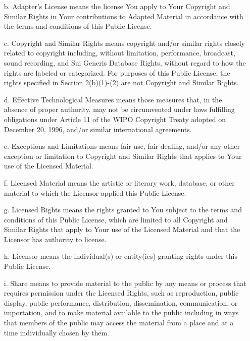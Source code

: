 \begin{scriptsize}
\begin{itemize}
  \item[b.] Adapter's License means the license You apply to Your Copyright
     and Similar Rights in Your contributions to Adapted Material in
     accordance with the terms and conditions of this Public License.

  \item[c.] Copyright and Similar Rights means copyright and/or similar rights
     closely related to copyright including, without limitation,
     performance, broadcast, sound recording, and Sui Generis Database
     Rights, without regard to how the rights are labeled or
     categorized. For purposes of this Public License, the rights
     specified in Section 2(b)(1)-(2) are not Copyright and Similar
     Rights.

  \item[d.] Effective Technological Measures means those measures that, in the
     absence of proper authority, may not be circumvented under laws
     fulfilling obligations under Article 11 of the WIPO Copyright
     Treaty adopted on December 20, 1996, and/or similar international
     agreements.

  \item[e.] Exceptions and Limitations means fair use, fair dealing, and/or
     any other exception or limitation to Copyright and Similar Rights
     that applies to Your use of the Licensed Material.

  \item[f.] Licensed Material means the artistic or literary work, database,
     or other material to which the Licensor applied this Public
     License.

  \item[g.] Licensed Rights means the rights granted to You subject to the
     terms and conditions of this Public License, which are limited to
     all Copyright and Similar Rights that apply to Your use of the
     Licensed Material and that the Licensor has authority to license.

  \item[h.] Licensor means the individual(s) or entity(ies) granting rights
     under this Public License.

  \item[i.] Share means to provide material to the public by any means or
     process that requires permission under the Licensed Rights, such
     as reproduction, public display, public performance, distribution,
     dissemination, communication, or importation, and to make material
     available to the public including in ways that members of the
     public may access the material from a place and at a time
     individually chosen by them.


\end{itemize}
\end{scriptsize}
